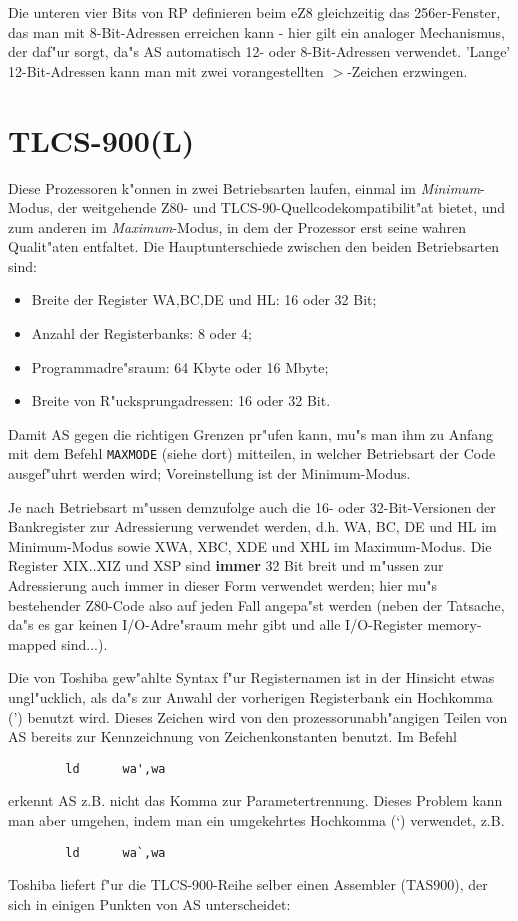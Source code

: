 \documentclass[12pt,a4paper,twoside]{report}
\newcommand{\ii}[1]{{\it #1}}
\newcommand{\bb}[1]{{\bf #1}}
\newcommand{\tty}[1]{{\tt #1}}
\begin{document}
Die unteren vier Bits von RP definieren beim eZ8 gleichzeitig das
256er-Fenster, das man mit 8-Bit-Adressen erreichen kann - hier gilt
ein analoger Mechanismus, der daf"ur sorgt, da"s AS automatisch 12-
oder 8-Bit-Adressen verwendet.  'Lange' 12-Bit-Adressen kann man mit
zwei vorangestellten $>$-Zeichen erzwingen.


\section{TLCS-900(L)}
\label{TLCS900Spec}

Diese Prozessoren k"onnen in zwei Betriebsarten laufen, einmal im
\ii{Minimum}-Modus, der weitgehende Z80- und TLCS-90-Quellcodekompatibilit"at
bietet, und zum anderen im \ii{Maximum}-Modus, in dem der Prozessor
erst seine wahren Qualit"aten entfaltet.  Die Hauptunterschiede zwischen
den beiden Betriebsarten sind:
\begin{itemize}
\item{Breite der Register WA,BC,DE und HL: 16 oder 32 Bit;}
\item{Anzahl der Registerbanks: 8 oder 4;}
\item{Programmadre"sraum: 64 Kbyte oder 16 Mbyte;}
\item{Breite von R"ucksprungadressen: 16 oder 32 Bit.}
\end{itemize}
Damit AS gegen die richtigen Grenzen pr"ufen kann, mu"s man ihm zu Anfang
mit dem Befehl \tty{MAXMODE} (siehe dort) mitteilen, in welcher Betriebsart
der Code ausgef"uhrt werden wird; Voreinstellung ist der Minimum-Modus.
\par
Je nach Betriebsart m"ussen demzufolge auch die 16- oder 32-Bit-Versionen
der Bankregister zur Adressierung verwendet werden, d.h. WA, BC, DE und HL
im Minimum-Modus sowie XWA, XBC, XDE und XHL im Maximum-Modus.  Die Register
XIX..XIZ und XSP sind \bb{immer} 32 Bit breit und m"ussen zur Adressierung
auch immer in dieser Form verwendet werden; hier mu"s bestehender Z80-Code
also auf jeden Fall angepa"st werden (neben der Tatsache, da"s es gar keinen
I/O-Adre"sraum mehr gibt und alle I/O-Register memory-mapped sind...).
\par
Die von Toshiba gew"ahlte Syntax f"ur Registernamen ist in der Hinsicht
etwas ungl"ucklich, als da"s zur Anwahl der vorherigen Registerbank ein
Hochkomma (') benutzt wird.
Dieses Zeichen wird von den prozessorunabh"angigen Teilen von AS bereits zur
Kennzeichnung von Zeichenkonstanten benutzt.  Im Befehl
\begin{verbatim}
        ld      wa',wa
\end{verbatim}
erkennt AS z.B. nicht das Komma zur Parametertrennung.
Dieses Problem kann man aber umgehen,
indem man ein umgekehrtes Hochkomma (`) verwendet, z.B.
\begin{verbatim}
        ld      wa`,wa
\end{verbatim}
Toshiba liefert f"ur die TLCS-900-Reihe selber einen Assembler (TAS900), der
sich in einigen Punkten von AS unterscheidet:
\end{document}
